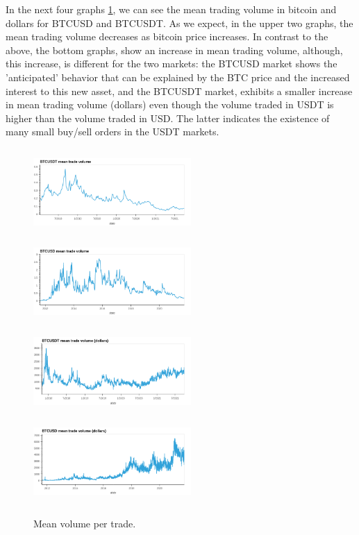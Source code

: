 \documentclass[10pt]{asme2ej}
\begin{document}
In the next four graphs \ref{fig:mean}, we can see the mean trading volume in bitcoin and dollars for BTCUSD and BTCUSDT. As we expect, in the upper two graphs, the mean trading volume decreases as bitcoin price increases. In contrast to the above, the bottom graphs, show an increase in mean trading volume, although, this increase, is different for the two markets: the BTCUSD market shows the 'anticipated' behavior that can be explained by the BTC price and the increased interest to this new asset, and the BTCUSDT market, exhibits a smaller increase in mean trading volume (dollars) even though the volume traded in USDT is higher than the volume traded in USD. The latter indicates the existence of many small buy/sell orders in the USDT markets.

\begin{figure}[H]
	\centering
	\includegraphics[width=6cm, height = 3.3cm]{mean1}
	\includegraphics[width=6cm, height = 3.3cm]{mean2}
	\\[\smallskipamount]
	\includegraphics[width=6cm, height = 3.3cm]{mean3}
	\includegraphics[width=6cm, height = 3.3cm]{mean4}
	\caption{Mean volume per trade.}
	\label{fig:mean}
\end{figure}
\end{document}
